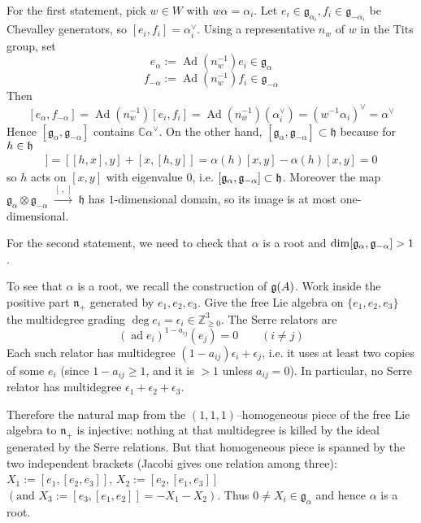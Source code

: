 \documentclass[12pt]{article}
\begin{document}
\begin{solution}[Incomplete]
    For the first statement, pick $w\in W$ with $w\alpha=\alpha_i$. Let $e_i\in\mathfrak g_{\alpha_i}, f_i\in\mathfrak g_{-\alpha_i}$ be Chevalley generators, so $[e_i,f_i]=\alpha_i^\vee$. Using a representative $n_w$ of $w$ in the Tits group, set
    \[e_\alpha:=\operatorname{Ad}(n_w^{-1})e_i\in\mathfrak g_\alpha\]\[
        f_{-\alpha}:=\operatorname{Ad}(n_w^{-1})f_i\in\mathfrak g_{-\alpha}\]
    Then
    \[[e_\alpha,f_{-\alpha}]
        =\operatorname{Ad}(n_w^{-1})[e_i,f_i]
        =\operatorname{Ad}(n_w^{-1})(\alpha_i^\vee)
        =(w^{-1}\alpha_i)^\vee=\alpha^\vee\]
    Hence $[\mathfrak g_\alpha,\mathfrak g_{-\alpha}]$ contains $\mathbb C\alpha^\vee$. On the other hand, $[\mathfrak g_\alpha,\mathfrak g_{-\alpha}]\subset\mathfrak h$ because for $h\in \mathfrak{h}$ \begin{align*}
        [h,[x,y]] = [[h,x],y]+[x,[h,y]] = \alpha(h)[x,y]-\alpha(h)[x,y]=0
    \end{align*} so $h$ acts on $[x,y]$ with eigenvalue $0$, i.e. $[\mathfrak g_\alpha,\mathfrak g_{-\alpha}] \subset \mathfrak{h}$.
    Moreover the map $\mathfrak g_\alpha \otimes \mathfrak g_{-\alpha}\;\xrightarrow{[\ ,\ ]}\; \mathfrak h$ has $1$-dimensional domain, so its image is at most one-dimensional.


    For the second statement, we need to check that $\alpha$ is a root and $\dim [\mathfrak{g}_\alpha,\mathfrak{g}_{-\alpha}]>1$. 
    
To see that $\alpha$ is a root, we recall the construction of $\mathfrak{g}(A)$. Work inside the positive part $\mathfrak{n}_+$ generated by $e_1,e_2,e_3$. Give the free Lie algebra on $\{e_1,e_2,e_3\}$ the multidegree grading $\deg e_i=\epsilon_i\in\mathbb{Z}_{\ge0}^3$. The Serre relators are
\[(\operatorname{ad}e_i)^{1-a_{ij}}(e_j)=0\qquad(i\neq j)\]
Each such relator has multidegree $(1-a_{ij})\epsilon_i+\epsilon_j$, i.e. it uses at least two copies of some $e_i$ (since $1-a_{ij}\ge1$, and it is $>1$ unless $a_{ij}=0$).  In particular, no Serre relator has multidegree $\epsilon_1+\epsilon_2+\epsilon_3$.

Therefore the natural map from the $(1,1,1)$–homogeneous piece of the free Lie algebra to $\mathfrak{n}_+$ is injective: nothing at that multidegree is killed by the ideal generated by the Serre relations. But that homogeneous piece is spanned by the two independent brackets (Jacobi gives one relation among three):
$X_1:=[e_1,[e_2,e_3]]$, $X_2:=[e_2,[e_1,e_3]]$ $(\text{and }X_3:=[e_3,[e_1,e_2]]=-X_1-X_2)$. Thus $0\neq X_i\in \mathfrak{g}_{\alpha}$ and hence $\alpha$ is a root.



\end{solution}
\end{document}
